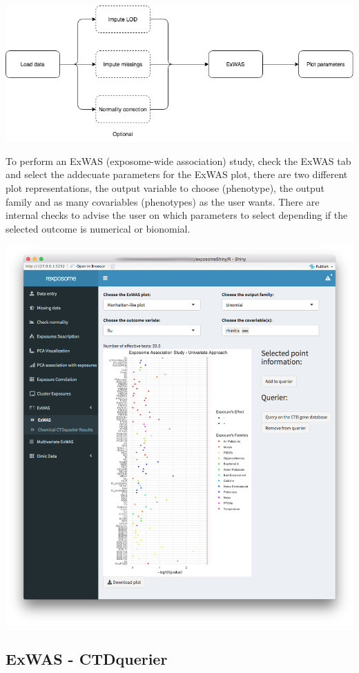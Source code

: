\documentclass[
]{book}
\begin{document}
\includegraphics{images/analysis7_1.png}

To perform an ExWAS (exposome-wide association) study, check the ExWAS tab and select the addecuate parameters for the ExWAS plot, there are two different plot representations, the output variable to choose (phenotype), the output family and as many covariables (phenotypes) as the user wants. There are internal checks to advise the user on which parameters to select depending if the selected outcome is numerical or bionomial.

\includegraphics{images/analysis7_2.png}

\hypertarget{exwas---ctdquerier}{%
\subsection{ExWAS - CTDquerier}\label{exwas---ctdquerier}}
\end{document}
